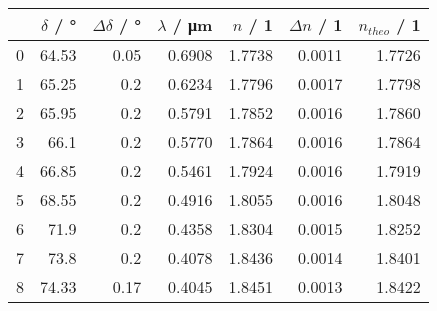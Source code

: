 \begin{tabular}{lrrrrrr}
	\toprule
	{} & $\delta$ / \si{\degree} & $\Delta \delta$ / \si{\degree} & $\lambda$ / \si{\um} & $n$ / 1 & $\Delta n$ / 1 & $n_{theo}$ / 1 \\
	\midrule
	0  & 64.53                   & 0.05                           & 0.6908               & 1.7738  & 0.0011         & 1.7726  \\
	1  & 65.25                   & 0.2                            & 0.6234               & 1.7796  & 0.0017         & 1.7798  \\
	2  & 65.95                   & 0.2                            & 0.5791               & 1.7852  & 0.0016         & 1.7860  \\
	3  & 66.1                    & 0.2                            & 0.5770               & 1.7864  & 0.0016         & 1.7864  \\
	4  & 66.85                   & 0.2                            & 0.5461               & 1.7924  & 0.0016         & 1.7919  \\
	5  & 68.55                   & 0.2                            & 0.4916               & 1.8055  & 0.0016         & 1.8048  \\
	6  & 71.9                    & 0.2                            & 0.4358               & 1.8304  & 0.0015         & 1.8252  \\
	7  & 73.8                    & 0.2                            & 0.4078               & 1.8436  & 0.0014         & 1.8401  \\
	8  & 74.33                   & 0.17                           & 0.4045               & 1.8451  & 0.0013         & 1.8422  \\
	\bottomrule
\end{tabular}
